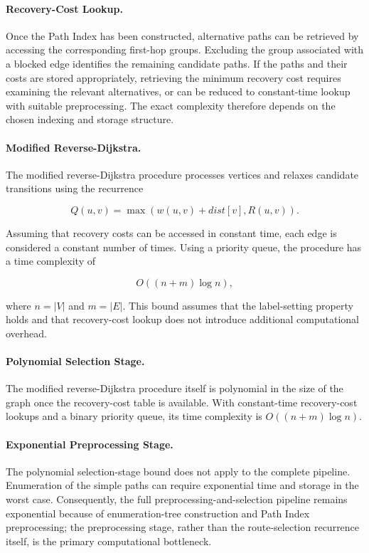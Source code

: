 \documentclass{article}
\begin{document}
\paragraph{Recovery-Cost Lookup.}

Once the Path Index has been constructed, alternative paths can be retrieved by accessing the corresponding first-hop groups. Excluding the group associated with a blocked edge identifies the remaining candidate paths. If the paths and their costs are stored appropriately, retrieving the minimum recovery cost requires examining the relevant alternatives, or can be reduced to constant-time lookup with suitable preprocessing. The exact complexity therefore depends on the chosen indexing and storage structure.

\paragraph{Modified Reverse-Dijkstra.}

The modified reverse-Dijkstra procedure processes vertices and relaxes candidate transitions using the recurrence

\[
Q(u,v)=\max\left(w(u,v)+dist[v],R(u,v)\right).
\]

Assuming that recovery costs can be accessed in constant time, each edge is considered a constant number of times. Using a priority queue, the procedure has a time complexity of

\[
O((n+m)\log n),
\]

where $n=|V|$ and $m=|E|$. This bound assumes that the label-setting property holds and that recovery-cost lookup does not introduce additional computational overhead.

\paragraph{Polynomial Selection Stage.}

The modified reverse-Dijkstra procedure itself is polynomial in the size of the graph once the recovery-cost table is available. With constant-time recovery-cost lookups and a binary priority queue, its time complexity is $O((n+m)\log n)$.

\paragraph{Exponential Preprocessing Stage.}

The polynomial selection-stage bound does not apply to the complete pipeline. Enumeration of the simple paths can require exponential time and storage in the worst case. Consequently, the full preprocessing-and-selection pipeline remains exponential because of enumeration-tree construction and Path Index preprocessing; the preprocessing stage, rather than the route-selection recurrence itself, is the primary computational bottleneck.
\end{document}
